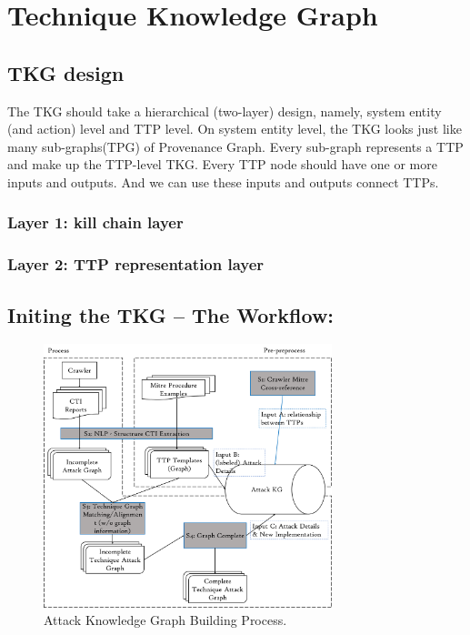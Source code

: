 \section{Technique Knowledge Graph}
\label{sec:tkg}

\subsection{TKG design}

The TKG should take a hierarchical (two-layer) design, namely, system entity (and action) level and TTP level. On system entity level, the TKG looks just like many sub-graphs(TPG) of Provenance Graph.  Every sub-graph represents a TTP and make up the TTP-level TKG. Every TTP node should have one or more inputs and outputs. And we can use these inputs and outputs connect TTPs.


\subsubsection{Layer 1: kill chain layer}

\subsubsection{Layer 2: TTP representation layer}

\subsection{Initing the TKG – The Workflow:
}

\begin{figure}
    \centering
    \includegraphics[width=3.3in]{Image/architecture.png}
    \caption{Attack Knowledge Graph Building Process.}
    \label{fig:architecture}
\end{figure}

